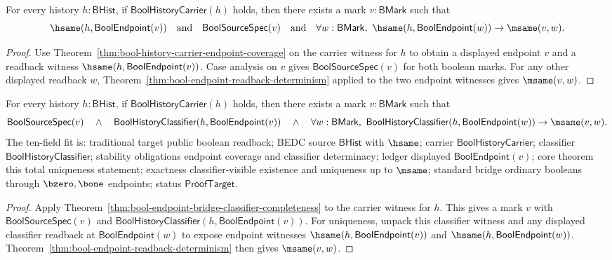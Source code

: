 \begin{theorem}
\label{thm:bool-endpoint-readback-total-unique}
For every history $h:\mathsf{BHist}$, if $\mathsf{BoolHistoryCarrier}(h)$
holds, then there exists a mark $v:\mathsf{BMark}$ such that
$$
  \hsame(h,\mathsf{BoolEndpoint}(v))
  \quad\text{and}\quad
  \mathsf{BoolSourceSpec}(v)
  \quad\text{and}\quad
  \forall w:\mathsf{BMark},\
    \hsame(h,\mathsf{BoolEndpoint}(w)) \to \msame(v,w).
$$
\end{theorem}
\begin{proof}
Use Theorem~\ref{thm:bool-history-carrier-endpoint-coverage} on the carrier
witness for $h$ to obtain a displayed endpoint $v$ and a readback witness
$\hsame(h,\mathsf{BoolEndpoint}(v))$. Case analysis on $v$ gives
$\mathsf{BoolSourceSpec}(v)$ for both boolean marks. For any other displayed
readback $w$, Theorem~\ref{thm:bool-endpoint-readback-determinism} applied to
the two endpoint witnesses gives $\msame(v,w)$.
\end{proof}

\begin{theorem}
\label{thm:bool-classifier-readback-total-unique}
For every history $h:\mathsf{BHist}$, if $\mathsf{BoolHistoryCarrier}(h)$
holds, then there exists a mark $v:\mathsf{BMark}$ such that
$$
  \mathsf{BoolSourceSpec}(v)
  \quad\land\quad
  \mathsf{BoolHistoryClassifier}(h,\mathsf{BoolEndpoint}(v))
  \quad\land\quad
  \forall w:\mathsf{BMark},\
    \mathsf{BoolHistoryClassifier}(h,\mathsf{BoolEndpoint}(w)) \to \msame(v,w).
$$
The ten-field fit is: traditional target public boolean readback; BEDC source
$\mathsf{BHist}$ with $\hsame$; carrier $\mathsf{BoolHistoryCarrier}$;
classifier $\mathsf{BoolHistoryClassifier}$; stability obligations endpoint
coverage and classifier determinacy; ledger displayed
$\mathsf{BoolEndpoint}(v)$; core theorem this total uniqueness statement;
exactness classifier-visible existence and uniqueness up to $\msame$; standard
bridge ordinary booleans through $\bzero,\bone$ endpoints; status
$\mathsf{ProofTarget}$.
\end{theorem}
\begin{proof}
Apply Theorem~\ref{thm:bool-endpoint-bridge-classifier-completeness} to the
carrier witness for $h$. This gives a mark $v$ with
$\mathsf{BoolSourceSpec}(v)$ and
$\mathsf{BoolHistoryClassifier}(h,\mathsf{BoolEndpoint}(v))$. For uniqueness,
unpack this classifier witness and any displayed classifier readback at
$\mathsf{BoolEndpoint}(w)$ to expose endpoint witnesses
$\hsame(h,\mathsf{BoolEndpoint}(v))$ and
$\hsame(h,\mathsf{BoolEndpoint}(w))$. Theorem~\ref{thm:bool-endpoint-readback-determinism}
then gives $\msame(v,w)$.
\end{proof}

